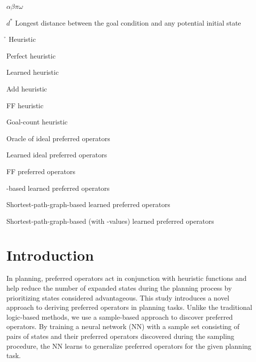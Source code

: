 \documentclass[ppgc,diss,english]{iiufrgs}
\begin{document}
\begin{listofsymbols}{$\alpha\beta\pi\omega$}
       \item[$d^{*}$] Longest distance between the goal condition and any potential initial state
       \item[\h] Heuristic
       \item[\hstar] Perfect heuristic
       \item[\hnn] Learned heuristic
       \item[\hadd] Add heuristic
       \item[\hff] FF heuristic
       \item[\hgc] Goal-count heuristic
       \item[\postartable] Oracle of ideal preferred operators
       \item[\postar] Learned ideal preferred operators
       \item[\poff] FF preferred operators
       \item[\pofsm] \bfsrw-based learned preferred operators
       \item[\pog] Shortest-path-graph-based learned preferred operators
       \item[\pogstar] Shortest-path-graph-based (with \hstar-values) learned preferred operators
\end{listofsymbols}

\listoffigures

\listoftables

\listofalgorithms

\tableofcontents

%
%
\chapter{Introduction}
\label{cha:introduction}
In planning, preferred operators act in conjunction with heuristic functions and help reduce the number of expanded states during the planning process by prioritizing states considered advantageous.
This study introduces a novel approach to deriving preferred operators in planning tasks. Unlike the traditional logic-based methods, we use a sample-based approach to discover preferred operators. By training a neural network (NN) with a sample set consisting of pairs of states and their preferred operators discovered during the sampling procedure, the NN learns to generalize preferred operators for the given planning task.
\end{document}
